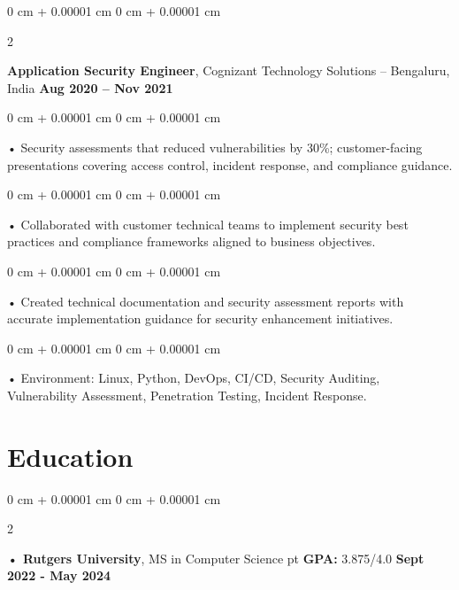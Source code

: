 \documentclass[10pt, letterpaper]{article}
\newenvironment{onecolentry}{
    \begin{adjustwidth}{
        0 cm + 0.00001 cm
    }{
        0 cm + 0.00001 cm
    }
}{
    \end{adjustwidth}
} %
\newenvironment{twocolentry}[2][]{
    \onecolentry
    \def\secondColumn{#2}
    \setcolumnwidth{\fill, 4.5 cm}
    \begin{paracol}{2}
}{
    \switchcolumn \raggedleft \secondColumn
    \end{paracol}
    \endonecolentry
} %
\begin{document}
        \begin{twocolentry}{
            \textbf{Aug 2020 – Nov 2021}
        }
            \vspace{2 pt }
            \textbf{Application Security Engineer}, Cognizant Technology Solutions -- Bengaluru, India\end{twocolentry}
        \begin{onecolentry}
             • Security assessments that reduced vulnerabilities by 30\%; customer-facing presentations covering access control, incident response, and compliance guidance.
        \end{onecolentry}
        \begin{onecolentry}
             • Collaborated with customer technical teams to implement security best practices and compliance frameworks aligned to business objectives.
        \end{onecolentry}
        \begin{onecolentry}
             • Created technical documentation and security assessment reports with accurate implementation guidance for security enhancement initiatives.
        \end{onecolentry}

        \begin{onecolentry}
             • Environment: Linux, Python, DevOps, CI/CD, Security Auditing, Vulnerability Assessment, Penetration Testing, Incident Response.
        \end{onecolentry}
    \vspace{2 pt }
        \section{Education}
        \vspace{2 pt }
        \begin{twocolentry}{
            \textbf{Sept 2022 - May 2024}
        }
            \textbf{ • Rutgers University}, MS in Computer Science  pt \textbf{GPA:} 3.875/4.0  \end{twocolentry}
\end{document}
